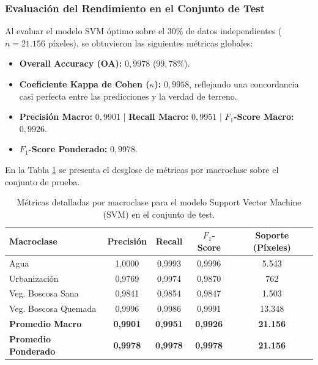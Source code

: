 \documentclass[12pt]{article}
\begin{document}
\subsubsection{Evaluación del Rendimiento en el Conjunto de Test}
Al evaluar el modelo SVM óptimo sobre el 30\% de datos independientes ($n = 21.156$ píxeles), se obtuvieron las siguientes métricas globales:
\begin{itemize}
    \item \textbf{Overall Accuracy (OA):} $0{,}9978$ ($99{,}78\%$).
    \item \textbf{Coeficiente Kappa de Cohen ($\kappa$):} $0{,}9958$, reflejando una concordancia casi perfecta entre las predicciones y la verdad de terreno.
    \item \textbf{Precisión Macro:} $0{,}9901$ | \textbf{Recall Macro:} $0{,}9951$ | \textbf{$F_1$-Score Macro:} $0{,}9926$.
    \item \textbf{$F_1$-Score Ponderado:} $0{,}9978$.
\end{itemize}

En la Tabla \ref{tab:reporte_svm} se presenta el desglose de métricas por macroclase sobre el conjunto de prueba.

\begin{table}[H]
    \centering
    \caption{Métricas detalladas por macroclase para el modelo Support Vector Machine (SVM) en el conjunto de test.}
    \label{tab:reporte_svm}
    \begin{tabular}{@{}lcccc@{}}
        \toprule
        \textbf{Macroclase} & \textbf{Precisión} & \textbf{Recall} & \textbf{$F_1$-Score} & \textbf{Soporte (Píxeles)} \\
        \midrule
        Agua & 1,0000 & 0,9993 & 0,9996 & 5.543 \\
        Urbanización & 0,9769 & 0,9974 & 0,9870 & 762 \\
        Veg. Boscosa Sana & 0,9841 & 0,9854 & 0,9847 & 1.503 \\
        Veg. Boscosa Quemada & 0,9996 & 0,9986 & 0,9991 & 13.348 \\
        \midrule
        \textbf{Promedio Macro} & \textbf{0,9901} & \textbf{0,9951} & \textbf{0,9926} & \textbf{21.156} \\
        \textbf{Promedio Ponderado} & \textbf{0,9978} & \textbf{0,9978} & \textbf{0,9978} & \textbf{21.156} \\
        \bottomrule
    \end{tabular}
\end{table}
\end{document}

